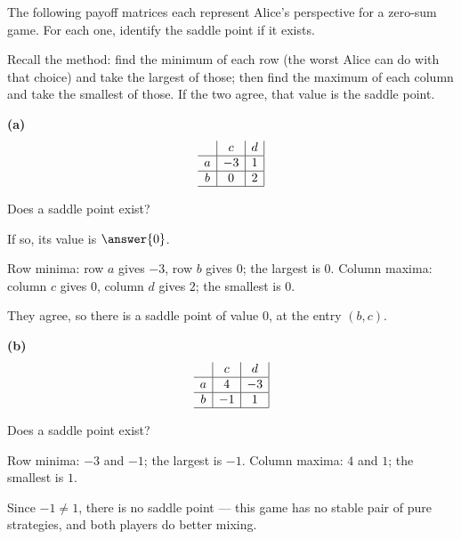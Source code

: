 \documentclass[12pt]{ximera}
\begin{document}
\begin{problem}
The following payoff matrices each represent Alice's perspective for a zero-sum game.
For each one, identify the saddle point if it exists.

Recall the method: find the minimum of each row (the worst Alice can do with that
choice) and take the largest of those; then find the maximum of each column and take
the smallest of those. If the two agree, that value is the saddle point.

\begin{prompt}
\textbf{(a)}
\[
\begin{array}{c|c|c|}
\phantom{|} & c & d \\\hline
a & -3 & 1 \\\hline
b & 0 & 2 \\\hline
\end{array}
\]

Does a saddle point exist?
\begin{multipleChoice}
\end{multipleChoice}

If so, its value is $\answer{0}$.

\begin{feedback}
Row minima: row $a$ gives $-3$, row $b$ gives $0$; the largest is $0$.
Column maxima: column $c$ gives $0$, column $d$ gives $2$; the smallest is $0$.

They agree, so there is a saddle point of value $0$, at the entry $(b,c)$.
\end{feedback}
\end{prompt}

\begin{prompt}
\textbf{(b)}
\[
\begin{array}{c|c|c|}
\phantom{|} & c & d \\\hline
a & 4 & -3 \\\hline
b & -1 & 1 \\\hline
\end{array}
\]

Does a saddle point exist?
\begin{multipleChoice}
\end{multipleChoice}

\begin{feedback}
Row minima: $-3$ and $-1$; the largest is $-1$.
Column maxima: $4$ and $1$; the smallest is $1$.

Since $-1\neq 1$, there is no saddle point --- this game has no stable pair of pure
strategies, and both players do better mixing.
\end{feedback}
\end{prompt}


\end{problem}
\end{document}
